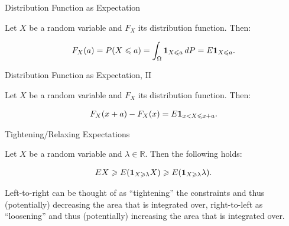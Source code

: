 \begin{observation}{}{Distribution Function as Expectation}

    Let $X$ be a random variable and $F_X$ its distribution function. Then:

        \begin{align*}
            F_X(a) = P(X \leqslant a) = \int_{\Omega} \mathbf{1}_{X \leqslant a} \, dP = E\mathbf{1}_{X \leqslant a}.
        \end{align*}

\end{observation}

\begin{observation}{}{Distribution Function as Expectation, II}

    Let $X$ be a random variable and $F_X$ its distribution function. Then:

        \begin{align*}
            F_X(x + a) - F_X(x) = E\mathbf{1}_{x < X \leqslant x + a}.
        \end{align*}

\end{observation}

\begin{observation}{}{Tightening/Relaxing Expectations}

    Let $X$ be a random variable and $\lambda \in \mathbb{R}$. Then the following  holds:

        \begin{align*}
            EX \geqslant E(\mathbf{1}_{X \geqslant \lambda}X) \geqslant E(\mathbf{1}_{X \geqslant \lambda}\lambda).
        \end{align*}

    Left-to-right can be thought of as ``tightening'' the constraints and thus (potentially) decreasing the area that is integrated over, right-to-left as ``loosening'' and thus (potentially) increasing the area that is integrated over.

\end{observation}

